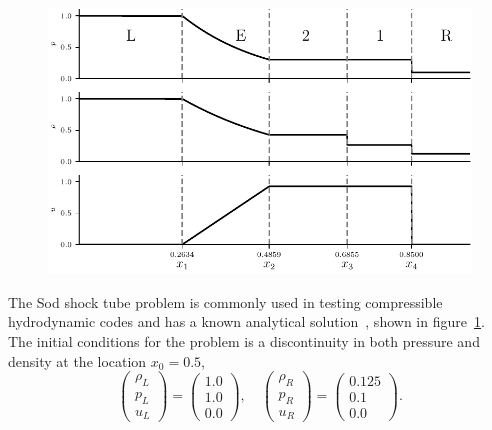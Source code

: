 \begin{figure}[t]
  \centering
  \includegraphics[width=\linewidth]{sod_analytical_solution.pdf}
  \label{fig:sod_analytical_solution}
\end{figure}

The Sod shock tube problem is commonly used in testing compressible hydrodynamic codes and has a known analytical solution~\cite{sodSurveySeveralFinite1978}, shown in figure~\ref{fig:sod_analytical_solution}. The initial conditions for the problem is a discontinuity in both pressure and density at the location $x_0=0.5$,
\begin{equation}
  \label{eq:sod_problem_ic}
\begin{pmatrix}\rho _{L}\\p_{L}\\u_{L}\end{pmatrix}
=
\begin{pmatrix}1.0\\1.0\\0.0\end{pmatrix}, \quad
\begin{pmatrix}\rho _{R}\\p_{R}\\u_{R}\end{pmatrix}
=
\begin{pmatrix}0.125\\0.1\\0.0\end{pmatrix}.
\end{equation}

